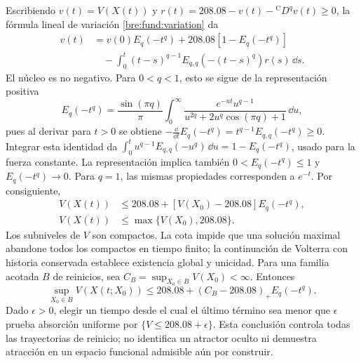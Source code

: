 Escribiendo \(v(t)=V(X(t))\) y
\(r(t)=208.08-v(t)-{}^{\mathrm C}D^qv(t)\geq0\), la fórmula lineal de
variación \eqref{bre:fund:variation} da
\begin{align*}
 v(t)&=v(0)E_q(-t^q)+208.08[1-E_q(-t^q)]\\
 &\quad-\int_0^t(t-s)^{q-1}E_{q,q}(-(t-s)^q)r(s)\,\dd s.
\end{align*}
El núcleo es no negativo. Para \(0<q<1\), esto se sigue de la
representación positiva \cite{Podlubny1999}
\[
 E_q(-t^q)=\frac{\sin(\pi q)}{\pi}
 \int_0^\infty
 \frac{e^{-ut}u^{q-1}}{u^{2q}+2u^q\cos(\pi q)+1}\,\dd u,
\]
pues al derivar para \(t>0\) se obtiene
\(-\frac{\dd}{\dd t}E_q(-t^q)=t^{q-1}E_{q,q}(-t^q)\geq0\).
Integrar esta identidad da
\(\int_0^t u^{q-1}E_{q,q}(-u^q)\,\dd u=1-E_q(-t^q)\), usado para
la fuerza constante. La representación implica también
\(0<E_q(-t^q)\leq1\) y \(E_q(-t^q)\to0\). Para \(q=1\), las mismas
propiedades corresponden a \(e^{-t}\). Por consiguiente,
\begin{equation}
 \begin{aligned}
 V(X(t))&\leq208.08+[V(X_0)-208.08]E_q(-t^q),\\
 V(X(t))&\leq\max\{V(X_0),208.08\}.
 \end{aligned}
 \label{bre:res:lorenz-bound}
\end{equation}
Los subniveles de \(V\) son compactos. La cota impide que una solución
maximal abandone todos los compactos en tiempo finito; la continuación de
Volterra con historia conservada establece existencia global y unicidad.
Para una familia acotada \(B\) de reinicios, sea
\(C_B=\sup_{X_0\in B}V(X_0)<\infty\). Entonces
\[
 \sup_{X_0\in B}V(X(t;X_0))
 \leq208.08+(C_B-208.08)_+E_q(-t^q).
\]
Dado \(\epsilon>0\), elegir un tiempo desde el cual el último término sea
menor que \(\epsilon\) prueba absorción uniforme por
\(\{V\leq208.08+\epsilon\}\). Esta conclusión controla todas las
trayectorias de reinicio; no identifica un atractor oculto ni demuestra
atracción en un espacio funcional admisible aún por construir.

